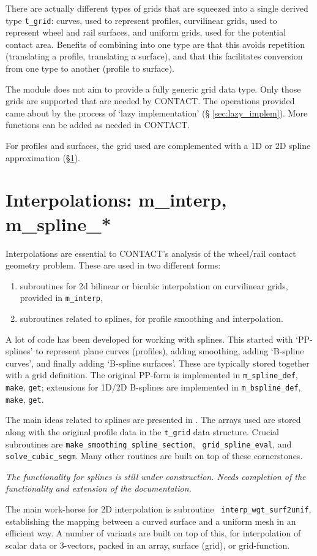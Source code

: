 \documentclass[12pt]{report}
\begin{document}
There are actually different types of grids that are squeezed into a
single derived type {\tt t\_grid}: curves, used to represent profiles,
curvilinear grids, used to represent wheel and rail surfaces, and uniform
grids, used for the potential contact area. Benefits of combining into one
type are that this avoids repetition (translating a profile, translating a
surface), and that this facilitates conversion from one type to another
(profile to surface).

The module does not aim to provide a fully generic grid data type. Only
those grids are supported that are needed by CONTACT. The operations
provided came about by the process of `lazy implementation' (\S 
\ref{sec:lazy_implem}). More functions can be added as needed in CONTACT.

For profiles and surfaces, the grid used are complemented with a 1D or 2D
spline approximation (\S \ref{sec:m_interp}).

\section{Interpolations: m\_interp, m\_spline\_*}
\label{sec:m_interp}

Interpolations are essential to CONTACT's analysis of the wheel/rail
contact geometry problem. These are used in two different forms: 
\begin{enumerate}
\item subroutines for 2d bilinear or bicubic interpolation on curvilinear
        grids, provided in {\tt m\_interp},
\item subroutines related to splines, for profile smoothing and
        interpolation.
\end{enumerate}
A lot of code has been developed for working with splines. This started
with `PP-splines' to represent plane curves (profiles), adding smoothing,
adding `B-spline curves', and finally adding `B-spline surfaces'.
These are typically stored together with a grid definition. The original
PP-form is implemented in {\tt m\_spline\_def}, {\tt make}, {\tt get};
extensions for 1D/2D B-splines are implemented in {\tt m\_bspline\_def},
{\tt make}, {\tt get}.

The main ideas related to splines are presented in
\cite{Vollebregt2020b-wrgeom}. The arrays used are stored along with the
original profile data in the {\tt t\_grid} data structure. Crucial
subroutines are {\tt make\_smoothing\_spline\_\-section}, {\tt
grid\_spline\_eval}, and {\tt solve\_cubic\_segm}. Many other routines are
built on top of these cornerstones.

{\em The functionality for splines is still under construction. Needs
completion of the functionality and extension of the documentation.}

The main work-horse for 2D interpolation is subroutine {\tt
interp\_wgt\_surf2unif}, establishing the mapping between a curved surface
and a uniform mesh in an efficient way. A number of variants are built on
top of this, for interpolation of scalar data or 3-vectors, packed in an
array, surface (grid), or grid-function. 



\end{document}
